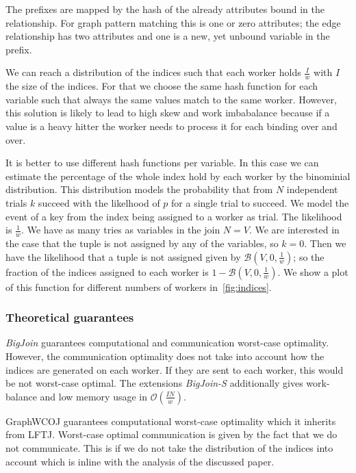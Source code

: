 The prefixes are mapped by the hash of the already attributes bound in the relationship.
For graph pattern matching this is one or zero attributes;
the edge relationship has two attributes and one is a new, yet unbound variable in the prefix.

We can reach a distribution of the indices such that each worker holds $\frac{I}{w}$ with $I$ the size of the indices.
For that we choose the same hash function for each variable such that always the same values match to the same worker.
However, this solution is likely to lead to high skew and work imbabalance because if a value is a heavy hitter the
worker needs to process it for each binding over and over.

It is better to use different hash functions per variable.
In this case we can estimate the percentage of the whole index hold by each worker by the binominial distribution.
This distribution models the probability that from $N$ independent trials $k$ succeed with the likelhood of $p$ for a single trial
to succeed.
We model the event of a key from the index being assigned to a worker as trial.
The likelihood is $\frac{1}{w}$.
We have as many tries as variables in the join $N = V$.
We are interested in the case that the tuple is not assigned by any of the variables, so $k = 0$.
Then we have the likelihood that a tuple is not assigned given by $\mathcal{B} (V, 0, \frac{1}{w})$;
so the fraction of the indices assigned to each worker is $1 - \mathcal{B} (V, 0, \frac{1}{w})$.
We show a plot of this function for different numbers of workers in~\cref{fig:indices}.

\subsubsection{Theoretical guarantees}
\textit{BigJoin} guarantees computational and communication worst-case optimality.
However, the communication optimality does not take into account how the indices are generated on each worker.
If they are sent to each worker, this would be not worst-case optimal.
The extensions \textit{BigJoin-S} additionally gives work-balance and low memory usage in $\mathcal{O} (\frac{IN}{w})$.

GraphWCOJ guarantees computational worst-case optimality which it inherits from \textsc{LFTJ}.
Worst-case optimal communication is given by the fact that we do not communicate.
This is if we do not take the distribution of the indices into account which is inline with the analysis of the discussed paper.

